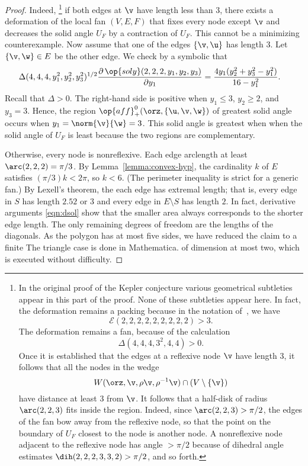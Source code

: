 \begin{proof}
  Indeed,%
\footnote{In the original proof of the Kepler conjecture 
  various geometrical subtleties appear in this part of the
  proof.  None of these subtleties appear here.  In fact, the
  deformation remains a packing because in the notation of~\cite{Hales:2006:DCG},
 we have
\[
{\mathcal E}(2,2,2,2,2,2,2,2,2)> 3.
\]
The deformation remains a fan, because of the calculation
\[
\Delta(4,4,4,3^2,4,4)>0.
\]
Once it is established that the edges at a reflexive node $\v$ have length $3$, it
follows that all the nodes in the wedge
\[
W(\orz,\v,\rho\v,\rho^{-1}\v)\cap (V\setminus\{\v\})
\]
have distance at least $3$ from $\v$.  It follows that a half-disk
of radius $\arc(2,2,3)$ fits inside the region.  Indeed, since
$\arc(2,2,3)>\pi/2$, the edges of the fan bow away from the reflexive node, so
that the point on the boundary of $U_F$ closest to the node is another
node.  
A nonreflexive node adjacent to the reflexive node has angle $>\pi/2$
because of dihedral angle estimates $\dih(2,2,2,3,3,2)>\pi/2$, and
so forth.  } 
if both edges at $\v$ have length less than $3$, there
exists a deformation of the local fan $(V,E,F)$ that fixes every node
except $\v$ and decreases the solid angle $U_F$ by a contraction of $U_F$.  
This cannot be a
minimizing counterexample.  Now assume that one of the edges
$\{\v,\u\}$ has length $3$.  Let $\{\v,\w\}\in E$ be the other edge.
We check by a symbolic
 that
\begin{align}\label{eqn:dsol}
\Delta(4,4,4,y_1^2,y_2^2,y_3^2)^{1/2}\dfrac{\partial\,\op{soly}(2,2,2,y_1,y_2,y_3)}{\partial y_1} &= 
\dfrac{4 y_1 (y_2^2 + y_3^2- y_1^2)}{16- y_1^2}.
\end{align}
 Recall that $\Delta>0$.
The right-hand side is positive
when $y_1\le3$, $y_2\ge 2$, and $y_3=3$. 
Hence, the region
$\op{aff}^0_+(\orz,\{\u,\v,\w\})$ of greatest
solid angle occurs when $y_1=\norm{\v}{\w}=3$.  This solid angle is greatest when
when the solid angle of $U_F$ is least because  the two regions are complementary.


  Otherwise,
every node is nonreflexive.  Each edge arclength at least
$\arc(2,2,2)=\pi/3$.  By Lemma~\ref{lemma:convex-hyp}, the cardinality
$k$ of $E$ satisfies $(\pi/3)k < 2\pi$, so $k<6$.  (The perimeter inequality is
strict for a generic fan.)  By Lexell's theorem, the each edge has
extremal length;  that is, every edge in $S$ has length $2.52$ or
$3$ and every edge in $E\setminus S$ has length $2$.  In fact, derivative
arguments \eqref{eqn:dsol} show that the smaller area always
corresponds to the shorter edge length.  The only
remaining degrees of freedom are the lengths of the diagonals.  As the
polygon has at most five sides, we have reduced the claim  to a
finite  %
{The triangle case is done in Mathematica.} of dimension at
most two, which is executed without difficulty.


\end{proof}
